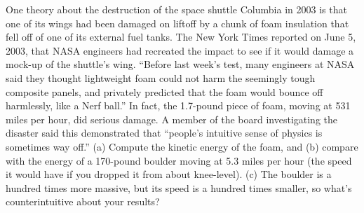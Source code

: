 One theory about the destruction of the space shuttle
Columbia in 2003 is that one of its wings had been damaged
on liftoff by a chunk of foam insulation that fell off of
one of its external fuel tanks. The New York Times reported
on June 5, 2003, that NASA engineers had recreated the
impact to see if it would damage a mock-up of the shuttle's
wing. ``Before last week's test, many engineers at NASA said
they thought lightweight foam could not harm the seemingly
tough composite panels, and privately predicted that the
foam would bounce off harmlessly, like a Nerf ball.'' In
fact, the 1.7-pound piece of foam, moving at 531 miles per
hour, did serious damage. A member of the board investigating
the disaster said this demonstrated that ``people's
intuitive sense of physics is sometimes way off.'' (a)
Compute the kinetic energy of the foam, and (b) compare with
the energy of a 170-pound boulder moving at 5.3 miles per hour (the
speed it would have if you dropped it from about knee-level).\answercheck\hwendpart
(c) The boulder is a hundred times
more massive, but its speed is a hundred times smaller, so
what's counterintuitive about your results?
